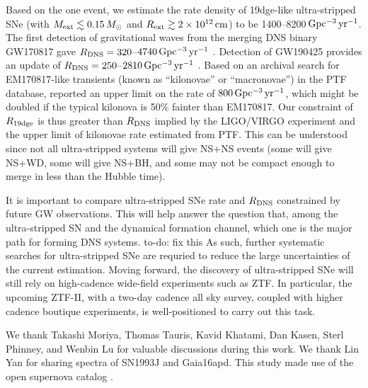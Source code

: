 \documentclass[twocolumn]{aastex63}
\newcommand{\name}{SN2019dge}
\newcommand{\todo}[1]{{\color{magenta} to-do: {#1}}}
\begin{document}
\begin{CJK*}{UTF8}{gbsn}
Based on the one event, we estimate the rate density of 19dge-like ultra-stripped SNe (with $M_{\rm 
ext}\lesssim 0.15\,M_\odot$ and $R_{\rm ext}\gtrsim 2\times 10^{12}\,{\rm cm}$) to be 
1400--8200\,${\rm Gpc^{-3}\, yr^{-1}}$. 
The first detection of gravitational waves from the merging DNS binary GW170817 gave 
$R_{\rm DNS}=320$--$4740\,{\rm Gpc^{-3}\, yr^{-1}}$ \citep{GW170817}. Detection of GW190425 
provides an update of $R_{\rm DNS}=250$--$2810\,{\rm Gpc^{-3}\, yr^{-1}}$ \citep{GW190425}. Based 
on an archival search for EM170817-like transients (known as ``kilonovae'' or ``macronovae'') in the 
PTF database, \citet{Kasliwal2017} reported an upper limit on the rate of $800\,{\rm Gpc^{-3}\, yr^{-1}}$, 
which might be doubled if the typical kilonova is 50\% fainter than EM170817. Our constraint of 
$R_{\rm 19dge}$ is thus greater than $R_{\rm DNS}$ implied by the LIGO/VIRGO experiment and the 
upper limit of kilonovae rate estimated from PTF. This can be understood since not all ultra-stripped 
systems will give NS+NS events (some will give NS+WD, some will give NS+BH, and some may not be 
compact enough to merge in less than the Hubble time). 

It is important to compare ultra-stripped SNe rate and $R_{\rm DNS}$ constrained by future GW 
observations. This will help answer the question that, among the ultra-stripped SN and the 
dynamical formation channel, which one is the major path for forming DNS systems. \todo{fix this} As 
such, further 
systematic searches for ultra-stripped SNe are requried to reduce the large uncertainties of the current 
estimation. Moving forward, the discovery of ultra-stripped SNe will still rely on high-cadence 
wide-field experiments such as ZTF. In particular, the upcoming ZTF-II, with a two-day cadence all 
sky survey, coupled with higher cadence boutique experiments, is well-positioned to carry out this 
task.

\acknowledgements

We thank Takashi Moriya, Thomas Tauris, Kavid Khatami, Dan Kasen, Sterl Phinney, and Wenbin 
Lu for valuable discussions during this work. We thank Lin Yan for sharing spectra 
of SN1993J and Gaia16apd.
This study made use of the open supernova catalog \citep{Guillochon2017}.


\end{CJK*}
\end{document}
